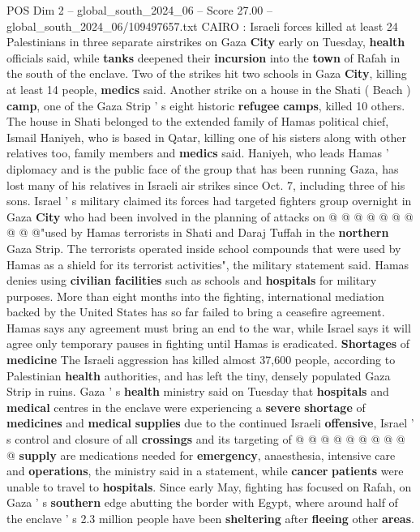 \begin{textsample}{POS Dim 2 – global\_south\_2024\_06 – Score 27.00 – global\_south\_2024\_06/109497657.txt}  \label{ex:f2_pos_056}
CAIRO : Israeli forces killed at least 24 Palestinians in three separate airstrikes on Gaza \textbf{City} early on Tuesday, \textbf{health} officials said, while \textbf{tanks} deepened their \textbf{incursion} into the \textbf{town} of Rafah in the south of the enclave.
Two of the strikes hit two schools in Gaza \textbf{City}, killing at least 14 people, \textbf{medics} said.
Another strike on a house in the Shati ( Beach ) \textbf{camp}, one of the Gaza Strip ' s eight historic \textbf{refugee} \textbf{camps}, killed 10 others.
The house in Shati belonged to the extended family of Hamas political chief, Ismail Haniyeh, who is based in Qatar, killing one of his sisters along with other relatives too, family members and \textbf{medics} said.
Haniyeh, who leads Hamas ' diplomacy and is the public face of the group that has been running Gaza, has lost many of his relatives in Israeli air strikes since Oct. 7, including three of his sons.
Israel ' s military claimed its forces had targeted fighters group overnight in Gaza \textbf{City} who had been involved in the planning of attacks on @ @ @ @ @ @ @ @ @ @"used by Hamas terrorists in Shati and Daraj Tuffah in the \textbf{northern} Gaza Strip.
The terrorists operated inside school compounds that were used by Hamas as a shield for its terrorist activities", the military statement said.
Hamas denies using \textbf{civilian} \textbf{facilities} such as schools and \textbf{hospitals} for military purposes.
More than eight months into the fighting, international mediation backed by the United States has so far failed to bring a ceasefire agreement.
Hamas says any agreement must bring an end to the war, while Israel says it will agree only temporary pauses in fighting until Hamas is eradicated. \textbf{Shortages} of \textbf{medicine} The Israeli aggression has killed almost 37,600 people, according to Palestinian \textbf{health} authorities, and has left the tiny, densely populated Gaza Strip in ruins.
Gaza ' s \textbf{health} ministry said on Tuesday that \textbf{hospitals} and \textbf{medical} centres in the enclave were experiencing a \textbf{severe} \textbf{shortage} of \textbf{medicines} and \textbf{medical} \textbf{supplies} due to the continued Israeli \textbf{offensive}, Israel ' s control and closure of all \textbf{crossings} and its targeting of @ @ @ @ @ @ @ @ @ @ \textbf{supply} are medications needed for \textbf{emergency}, anaesthesia, intensive care and \textbf{operations}, the ministry said in a statement, while \textbf{cancer} \textbf{patients} were unable to travel to \textbf{hospitals}.
Since early May, fighting has focused on Rafah, on Gaza ' s \textbf{southern} edge abutting the border with Egypt, where around half of the enclave ' s 2.3 million people have been \textbf{sheltering} after \textbf{fleeing} other \textbf{areas}.

\end{textsample}
